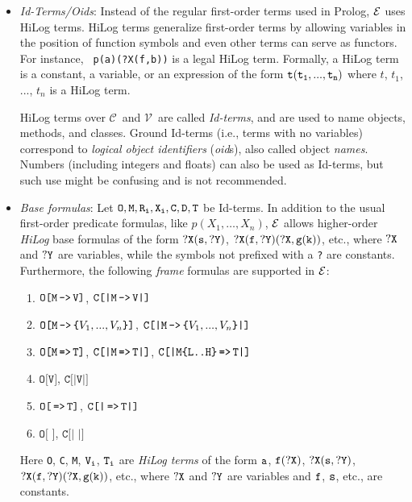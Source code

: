 \documentclass[11pt]{article}
\newcommand{\ERGO}{\mbox{\ensuremath{\cal{E}}\smaller{{\sc{RGO}}}}\xspace}
\newcommand{\FLSYSTEM}{\ERGO}
\newcommand{\mvd}{{\mbox{\tt \,->\,}}}  %
\newcommand{\Mvd}{{\mbox{\tt \,=>\,}}}  %
\newcommand{\fl}{\mbox{F-logic}\xspace}
\newcommand{\consts}{\ensuremath{\mathcal{C}}\xspace}
\newcommand{\vars}{\ensuremath{\mathcal{V}}\xspace}
\begin{document}
\begin{itemize}
\item \emph{Id-Terms/Oids}:
  Instead of the regular first-order terms used in Prolog, \FLSYSTEM
  uses HiLog terms. HiLog terms \cite{hilog-jlp} generalize first-order
  terms by allowing variables in the position of function symbols
  and even other terms can serve as functors. For instance, {\tt
  p(a)(?X(f,b))} is a legal HiLog term. Formally, a HiLog term is a
  constant, a variable, or an expression of the form $\tt t(t_1,...,t_n)$ 
  where $t$, $t_1$, ..., $t_n$ is a HiLog term.

    HiLog terms over \consts\ and \vars\ are called \emph{Id-terms},
    and are used to name objects, methods, and classes.  Ground Id-terms
    (i.e., terms with no variables) correspond to \emph{logical
      object identifiers} (\emph{oid}s), also called object \emph{names}.
    Numbers (including integers and floats) can also be used as Id-terms,
    but such use might be confusing and is not recommended.
  \index{base formula!in \fl}
\item \emph{Base formulas}: Let $\tt O,M,R_{i},X_{i},C,D,T$ be Id-terms.  In
  addition to the usual first-order predicate formulas, like
  $p(X_1,\dots,X_n)$, \FLSYSTEM allows higher-order \emph{HiLog} base
  formulas of the form $\tt ?X(s,?Y)$, $\tt ?X(f,?Y)(?X,g(k))$, etc., where $\tt ?X$
  and $\tt ?Y$ are variables, while the symbols not prefixed with a \texttt{?}
  are constants.  Furthermore,
  the following \emph{frame} formulas are supported in
  \FLSYSTEM:
  \medskip

  \begin{enumerate}
    \item \label{eq-value-atom} $\texttt{O[M\mvd V]}$, $\texttt{C[|M\mvd V|]}$
    \item $\texttt{O[M\mvd \{\ensuremath{V_1,...,V_n}\}]}$,
      $\texttt{C[|M\mvd \{\ensuremath{V_1,...,V_n}\}|]}$
    \item $\texttt{O[M\Mvd T]}$, $\texttt{C[|M\Mvd T|]}$, $\texttt{C[|M\{L..H\}\Mvd T|]}$
    \item $\texttt{O[V]}$, $\texttt{C[|V|]}$
    \item $\texttt{O[\Mvd T]}$, $\texttt{C[|\Mvd T|]}$
    \item $\texttt{O[~]}$, $\texttt{C[|~|]}$
  \end{enumerate}
  
  Here {\tt O}, {\tt C}, {\tt M}, ${\tt V_i}$,
  ${\tt T_i}$ are \emph{HiLog terms} of the form $\tt a$,
  $\tt f(?X)$, $\tt ?X(s,?Y)$, $\tt ?X(f,?Y)(?X,g(k))$, etc., where $\tt ?X$
  and $\tt ?Y$ are variables and $\tt f$, $\tt s$, etc., are
  constants.
  

\end{itemize}
\end{document}
